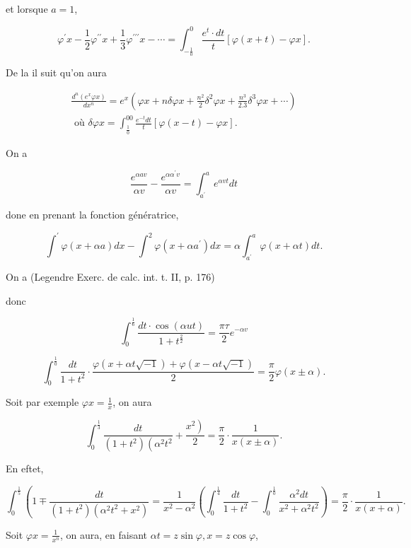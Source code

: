 \documentclass{article}
\begin{document}
et lorsque \(a=1\),

\[
\varphi^{\prime} x-\frac{1}{2} \varphi^{\prime \prime} x+\frac{1}{3} \varphi^{\prime \prime \prime} x-\cdots=\int_{-\frac{1}{0}}^{0} \frac{e^{t} \cdot d t}{t}[\varphi(x+t)-\varphi x] .
\]

De la il suit qu'on aura

\[
\begin{gathered}
\frac{d^{n}\left(e^{x} \varphi x\right)}{d x^{n}}=e^{x}\left(\varphi x+n \delta \varphi x+\frac{n^{2}}{2} \delta^{2} \varphi x+\frac{n^{3}}{2.3} \delta^{3} \varphi x+\cdots\right) \\
\text { où } \delta \varphi x=\int_{\frac{1}{0}}^{00} \frac{e^{-t} d t}{t}[\varphi(x-t)-\varphi x] .
\end{gathered}
\]

On a

\[
\frac{e^{\alpha a v}}{\alpha v}-\frac{e^{\alpha \alpha^{\prime} v}}{\alpha v}=\int_{a^{\prime}}^{a} e^{\alpha v t} d t
\]

done en prenant la fonction génératrice,

\[
\int^{\prime} \varphi(x+\alpha a) d x-\int^{2} \varphi\left(x+\alpha a^{\prime}\right) d x=\alpha \int_{a^{\prime}}^{a} \varphi(x+\alpha t) d t .
\]

On a (Legendre Exerc. de calc. int. t. II, p. 176)

donc

\[
\int_{0}^{\frac{1}{6}} \frac{d t \cdot \cos (\alpha u t)}{1+t^{\frac{2}{2}}}=\frac{\pi \tau}{2} e^{-\alpha v}
\]

\[
\int_{0}^{\frac{1}{0}} \frac{d t}{1+t^{2}} \cdot \frac{\varphi(x+\alpha t \sqrt{-1})+\varphi(x-\alpha t \sqrt{-1})}{2}=\frac{\pi}{2} \varphi(x \pm \alpha) .
\]

Soit par exemple \(\varphi x=\frac{1}{x}\), on aura

\[
\int_{0}^{\frac{1}{3}} \frac{d t}{\left(1+t^{2}\right)\left(\alpha^{2} t^{2}\right.}+\frac{\left.x^{2}\right)}{2}=\frac{\pi}{2} \cdot \frac{1}{x(x \pm \alpha)} .
\]

En eftet,

\[
\int_{0}^{\frac{1}{5}}\left(1 \mp \frac{d t}{\left(1+t^{2}\right)\left(\alpha^{2} t^{2}+x^{2}\right)}=\frac{1}{x^{2}-\alpha^{2}}\left(\int_{0}^{\frac{1}{4}} \frac{d t}{1+t^{2}}-\int_{0}^{\frac{1}{0}} \frac{\alpha^{2} d t}{x^{2}+\alpha^{2} t^{2}}\right)=\frac{\pi}{2} \cdot \frac{1}{x(x+\alpha)} .\right.
\]

Soit \(\varphi x=\frac{1}{x^{n}}\), on aura, en faisant \(\alpha t=z \sin \varphi, x=z \cos \varphi\),
\end{document}
